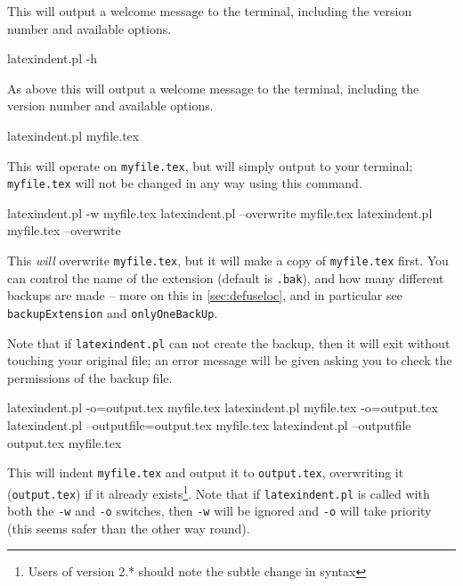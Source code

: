 This will output a welcome message to the terminal, including the version number
and available options.


\begin{commandshell}
latexindent.pl -h
      \end{commandshell}

As above this will output a welcome message to the terminal, including the version number
and available options.
\begin{commandshell}
latexindent.pl myfile.tex
      \end{commandshell}

This will operate on \texttt{myfile.tex}, but will simply output to your terminal; \texttt{myfile.tex} will	not be changed in any way using this command.

\begin{commandshell}
latexindent.pl -w myfile.tex
latexindent.pl --overwrite myfile.tex
latexindent.pl myfile.tex --overwrite 
      \end{commandshell}

This \emph{will} overwrite \texttt{myfile.tex}, but it will
make a copy of \texttt{myfile.tex} first. You can control the name of
the extension (default is \texttt{.bak}), and how many different backups are made --
more on this in \cref{sec:defuseloc}, and in particular see \texttt{backupExtension} and \texttt{onlyOneBackUp}.

Note that if \texttt{latexindent.pl} can not create the backup, then it
will exit without touching your original file; an error message will be given
asking you to check the permissions of the backup file.

\begin{commandshell} 
latexindent.pl -o=output.tex myfile.tex
latexindent.pl myfile.tex -o=output.tex 
latexindent.pl --outputfile=output.tex myfile.tex
latexindent.pl --outputfile output.tex myfile.tex
      \end{commandshell}

This will indent \texttt{myfile.tex} and output it to \texttt{output.tex},
overwriting it (\texttt{output.tex}) if it already exists\footnote{Users of version 2.* should
	note the subtle change in syntax}. Note that if \texttt{latexindent.pl} is called with both
the \texttt{-w} and \texttt{-o} switches, then \texttt{-w} will
be ignored and \texttt{-o} will take priority (this seems safer than the
other way round).

